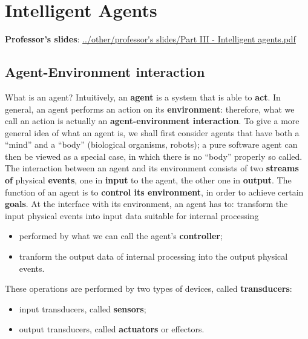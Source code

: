 \section{Intelligent Agents}
\textbf{Professor's slides}:\newline
\url{../other/professor's slides/Part III - Intelligent agents.pdf}\newline
\newline
\subsection{Agent-Environment interaction}
What is an agent? Intuitively, an \textbf{agent} is a system that is able to \textbf{act}.\newline
\newline
In general, an agent performs an action on its \textbf{environment}: therefore, what we call
an action is actually an \textbf{agent-environment interaction}. To give a more general idea of what an agent is, we shall first consider agents that have
both a “mind” and a “body” (biological organisms, robots); a pure software agent can then
be viewed as a special case, in which there is no “body” properly so called.\newline
\newline
The interaction between an agent and its environment consists of two \textbf{streams of} physical
\textbf{events}, one in \textbf{input} to the agent, the other one in \textbf{output}.\newline
\newline
The function of an agent is to \textbf{control its environment}, in order to achieve certain \textbf{goals}.\newline
\newline
At the interface with its environment, an agent has to:
transform the input physical events into input data suitable for internal processing\begin{itemize}
    \item performed by what we can call the agent’s \textbf{controller};
    \item tranform the output data of internal processing into the output physical events.
\end{itemize}
These operations are performed by two types of devices, called \textbf{transducers}:
\begin{itemize}
    \item input transducers, called \textbf{sensors};
    \item output transducers, called \textbf{actuators} or effectors.
\end{itemize}
